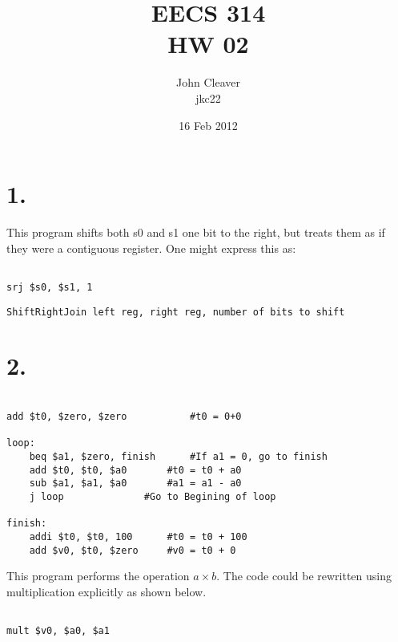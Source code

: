 \documentclass[12pt]{article}
\title{EECS 314 \\ HW 02}
\author{John Cleaver \\ jkc22}
\date{16 Feb 2012}
\begin{document}
\lstset{language=[mips]Assembler}
\maketitle

\section*{1.}

This program shifts both s0 and s1 one bit to the right, but treats them as if they were a contiguous register. One might express this as:

\begin{lstlisting}

srj $s0, $s1, 1

\end{lstlisting}

\begin{verbatim}
ShiftRightJoin left reg, right reg, number of bits to shift
\end{verbatim}



\section*{2.}

\begin{lstlisting}

add $t0, $zero, $zero 			#t0 = 0+0

loop:
	beq $a1, $zero, finish 		#If a1 = 0, go to finish
	add $t0, $t0, $a0 		#t0 = t0 + a0
	sub $a1, $a1, $a0 		#a1 = a1 - a0
	j loop				#Go to Begining of loop

finish:
	addi $t0, $t0, 100		#t0 = t0 + 100
	add $v0, $t0, $zero		#v0 = t0 + 0

\end{lstlisting}

This program performs the operation $a \times b$. The code could be rewritten using multiplication explicitly as shown below.

\begin{lstlisting}

mult $v0, $a0, $a1

\end{lstlisting}
\end{document}
